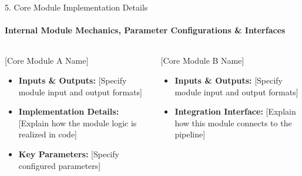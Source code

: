 \documentclass[aspectratio=169, 11pt]{beamer}
\begin{document}
\begin{frame}{5. Core Module Implementation Details}
    \framesubtitle{Internal Module Mechanics, Parameter Configurations \& Interfaces}
    \begin{columns}[T]
        \begin{block}{[Core Module A Name]}
            \footnotesize
            \begin{itemize}
                \item \textbf{Inputs \& Outputs:} {[Specify module input and output formats]}
                \item \textbf{Implementation Details:} {[Explain how the module logic is realized in code]}
                \item \textbf{Key Parameters:} {[Specify configured parameters]}
            \end{itemize}
        \end{block}

        \begin{block}{[Core Module B Name]}
            \footnotesize
            \begin{itemize}
                \item \textbf{Inputs \& Outputs:} {[Specify module input and output formats]}
                \item \textbf{Integration Interface:} {[Explain how this module connects to the pipeline]}
            \end{itemize}
        \end{block}

        \centering
        \vspace{0.2cm}
    \end{columns}
\end{frame}

\end{document}
